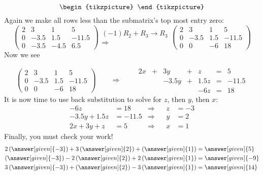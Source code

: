 \documentclass{ximera}
\begin{document}
\begin{example}
\begin{explanation}
\[\begin{tikzpicture}
\end{tikzpicture}
\]
Again we make all rows less than the submatrix's top most entry zero:
\[
\begin{pmatrix}
  2 & 3 & 1 & 5 \\
  0 & -3.5 & 1.5 &-11.5 \\
  0 & -3.5 & -4.5 & 6.5
\end{pmatrix}
\begin{array}{c}
  (-1) R_2+R_3\to R_3\\ \Longrightarrow
\end{array}
\begin{pmatrix}
  2 & 3 & 1 & 5 \\
  0 & -3.5 & 1.5 &-11.5 \\
  0 & 0    & -6 & 18
\end{pmatrix}
\]
Now we see

\[
\left(\begin{array}{ccc|c}
  2 & 3 & 1 & 5 \\
  0 & -3.5 & 1.5 &-11.5 \\
  0 & 0    & -6 & 18
\end{array}\right)
\qquad\Longrightarrow\qquad
\begin{array}{ccccccc}
     2x  &+ & 3y &+& z &=& 5 \\
     &  &-3.5y&+&1.5z&=&-11.5\\
     & & & &-6z&=&18
\end{array}
\]
It is now time to use back substitution to solve for $z$, then $y$, then $x$:
\begin{align*}
  -6z &= 18   &\Rightarrow & & z &= -3\\
  -3.5y+1.5z &=-11.5 &\Rightarrow & & y &= 2\\
  2x  +  3y + z &= 5 &\Rightarrow & & x &= 1
\end{align*}
Finally, you must check your work!
  \begin{align*}
    2\left(\answer[given]{-3}\right)+ 3\left(\answer[given]{2}\right) + \left(\answer[given]{1}\right)  &= \answer[given]{5} \\
    \left(\answer[given]{-3}\right) -2\left(\answer[given]{2}\right)+ 2\left(\answer[given]{1}\right) &=\answer[given]{-9}\\
    3\left(\answer[given]{-3}\right) +\left(\answer[given]{2}\right)- 3\left(\answer[given]{1}\right) &=\answer[given]{14}
  \end{align*}


\end{explanation}
\end{example}
\end{document}
